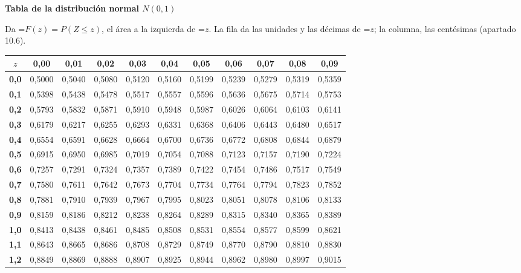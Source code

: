 \documentclass[11pt,a4paper]{article}
\newcommand{\fmm}[1]{\setbox0=\hbox{$#1$}\ifdim\wd0>\linewidth\[#1\]\else\mbox{\box0}\fi}
\begin{document}
\clearpage
\label{tnorm}{\color{fmgreen}\large\bfseries Tabla de la distribución normal $N(0,1)$}\par\smallskip
Da \fmm{F(z)=P(Z\leq z)}, el área a la izquierda de \fmm{z}. La fila da las unidades y las décimas de \fmm{z}; la columna, las centésimas (apartado 10.6).\par\smallskip
\begin{center}\linespread{1}\selectfont\small\setlength{\tabcolsep}{6pt}\renewcommand{\arraystretch}{1.08}
\begin{tabular}{c|cccccccccc}\toprule
$z$ & \textbf{0,00} & \textbf{0,01} & \textbf{0,02} & \textbf{0,03} & \textbf{0,04} & \textbf{0,05} & \textbf{0,06} & \textbf{0,07} & \textbf{0,08} & \textbf{0,09}\\\midrule
\textbf{0,0} & 0,5000 & 0,5040 & 0,5080 & 0,5120 & 0,5160 & 0,5199 & 0,5239 & 0,5279 & 0,5319 & 0,5359\\
\textbf{0,1} & 0,5398 & 0,5438 & 0,5478 & 0,5517 & 0,5557 & 0,5596 & 0,5636 & 0,5675 & 0,5714 & 0,5753\\
\textbf{0,2} & 0,5793 & 0,5832 & 0,5871 & 0,5910 & 0,5948 & 0,5987 & 0,6026 & 0,6064 & 0,6103 & 0,6141\\
\textbf{0,3} & 0,6179 & 0,6217 & 0,6255 & 0,6293 & 0,6331 & 0,6368 & 0,6406 & 0,6443 & 0,6480 & 0,6517\\
\textbf{0,4} & 0,6554 & 0,6591 & 0,6628 & 0,6664 & 0,6700 & 0,6736 & 0,6772 & 0,6808 & 0,6844 & 0,6879\\[2pt]
\textbf{0,5} & 0,6915 & 0,6950 & 0,6985 & 0,7019 & 0,7054 & 0,7088 & 0,7123 & 0,7157 & 0,7190 & 0,7224\\
\textbf{0,6} & 0,7257 & 0,7291 & 0,7324 & 0,7357 & 0,7389 & 0,7422 & 0,7454 & 0,7486 & 0,7517 & 0,7549\\
\textbf{0,7} & 0,7580 & 0,7611 & 0,7642 & 0,7673 & 0,7704 & 0,7734 & 0,7764 & 0,7794 & 0,7823 & 0,7852\\
\textbf{0,8} & 0,7881 & 0,7910 & 0,7939 & 0,7967 & 0,7995 & 0,8023 & 0,8051 & 0,8078 & 0,8106 & 0,8133\\
\textbf{0,9} & 0,8159 & 0,8186 & 0,8212 & 0,8238 & 0,8264 & 0,8289 & 0,8315 & 0,8340 & 0,8365 & 0,8389\\[2pt]
\textbf{1,0} & 0,8413 & 0,8438 & 0,8461 & 0,8485 & 0,8508 & 0,8531 & 0,8554 & 0,8577 & 0,8599 & 0,8621\\
\textbf{1,1} & 0,8643 & 0,8665 & 0,8686 & 0,8708 & 0,8729 & 0,8749 & 0,8770 & 0,8790 & 0,8810 & 0,8830\\
\textbf{1,2} & 0,8849 & 0,8869 & 0,8888 & 0,8907 & 0,8925 & 0,8944 & 0,8962 & 0,8980 & 0,8997 & 0,9015\\

\end{tabular}
\end{center}
\end{document}

